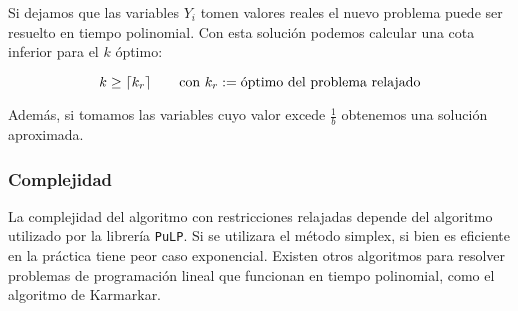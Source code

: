 Si dejamos que las variables $Y_i$ tomen valores reales el nuevo problema puede
ser resuelto en tiempo polinomial. Con esta soluci\'on podemos calcular una
cota inferior para el $k$ \'optimo:

\begin{equation}
    k \ge \lceil k_r\rceil \qquad \text{con} \ k_r := \text{\'optimo del problema
    relajado}
\end{equation}

Adem\'as, si tomamos las variables cuyo valor excede $\frac{1}{b}$ obtenemos
una soluci\'on aproximada.

\subsubsection{Complejidad}

La complejidad del algoritmo con restricciones relajadas depende del algoritmo
utilizado por la librer\'ia \texttt{PuLP}. Si se utilizara el m\'etodo simplex,
si bien es eficiente en la pr\'actica tiene peor caso exponencial. Existen
otros algoritmos para resolver problemas de programaci\'on lineal que funcionan
en tiempo polinomial, como el algoritmo de Karmarkar.
